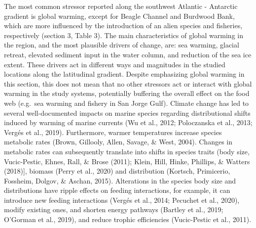 \documentclass[
]{article}
\begin{document}
The most common stressor reported along the southwest Atlantic -
Antarctic gradient is global warming, except for Beagle Channel and
Burdwood Bank, which are more influenced by the introduction of an alien
species and fisheries, respectively (section 3, Table 3). The main
characteristics of global warming in the region, and the most plausible
drivers of change, are: sea warming, glacial retreat, elevated sediment
input in the water column, and reduction of the sea ice extent. These
drivers act in different ways and magnitudes in the studied locations
along the latitudinal gradient. Despite emphasizing global warming in
this section, this does not mean that no other stressors act or interact
with global warming in the study systems, potentially buffering the
overall effect on the food web (e.g.~sea warming and fishery in San
Jorge Gulf). Climate change has led to several well-documented impacts
on marine species regarding distributional shifts induced by warming of
marine currents (Wu et al., 2012; Poloczanska et al., 2013; Vergés et
al., 2019). Furthermore, warmer temperatures increase species metabolic
rates (Brown, Gillooly, Allen, Savage, \& West, 2004). Changes in
metabolic rates can subsequently translate into shifts in species traits
(body size, Vucic-Pestic, Ehnes, Rall, \& Brose (2011); Klein, Hill,
Hinke, Phillips, \& Watters (2018){]}, biomass (Perry et al., 2020) and
distribution (Kortsch, Primicerio, Fossheim, Dolgov, \& Aschan, 2015).
Alterations in the species body size and distributions have ripple
effects on feeding interactions, for example, it can introduce new
feeding interactions (Vergés et al., 2014; Pecuchet et al., 2020),
modify existing ones, and shorten energy pathways (Bartley et al., 2019;
O'Gorman et al., 2019), and reduce trophic efficiencies (Vucic-Pestic et
al., 2011).
\end{document}
